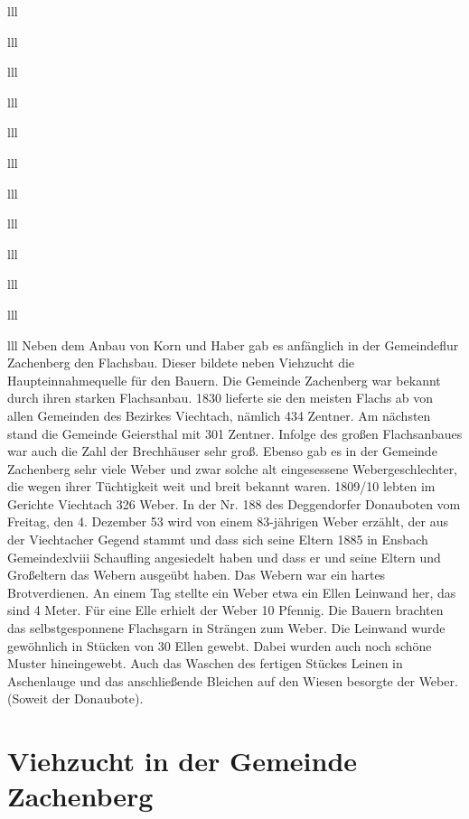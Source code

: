 \documentclass[12pt,a4pager]{book}
\begin{document}
\begin{tabuluar}{lll}
\begin{tabuluar}{lll}
\begin{tabuluar}{lll}
\begin{tabuluar}{lll}
\begin{tabuluar}{lll}
\begin{tabuluar}{lll}
\begin{tabuluar}{lll}
\begin{tabuluar}{lll}
\begin{tabuluar}{lll}
\begin{tabuluar}{lll}
\begin{tabuluar}{lll}
\begin{tabuluar}{lll}
Neben dem Anbau von Korn und Haber gab es anfänglich in der Gemeindeflur
Zachenberg den Flachsbau. Dieser bildete neben Viehzucht die Haupteinnahmequelle
für den Bauern. Die Gemeinde Zachenberg war bekannt durch ihren starken
Flachsanbau. 1830 lieferte sie den meisten Flachs ab von allen Gemeinden des
Bezirkes Viechtach, nämlich 434 Zentner. Am nächsten stand die Gemeinde
Geiersthal mit 301 Zentner. Infolge des großen Flachsanbaues war auch die Zahl
der Brechhäuser sehr groß. Ebenso gab es in der Gemeinde Zachenberg sehr viele
Weber und zwar solche alt eingesessene Webergeschlechter, die wegen ihrer
Tüchtigkeit weit und breit bekannt waren. 1809/10 lebten im Gerichte Viechtach
326 Weber. In der Nr. 188 des Deggendorfer Donauboten vom Freitag, den 4.
Dezember 53 wird von einem 83-jährigen Weber erzählt, der aus der Viechtacher
Gegend stammt und dass sich seine Eltern 1885 in Ensbach Gemeindexlviii
Schaufling angesiedelt haben und dass er und seine Eltern und Großeltern das
Webern ausgeübt haben. Das Webern war ein hartes Brotverdienen. An einem Tag
stellte ein Weber etwa ein Ellen Leinwand her, das sind 4 Meter. Für eine Elle
erhielt der Weber 10 Pfennig. Die Bauern brachten das selbstgesponnene
Flachsgarn in Strängen zum Weber. Die Leinwand wurde gewöhnlich in Stücken von
30 Ellen gewebt. Dabei wurden auch noch schöne Muster hineingewebt. Auch das
Waschen des fertigen Stückes Leinen in Aschenlauge und das anschließende
Bleichen auf den Wiesen besorgte der Weber. (Soweit der Donaubote).

\section{Viehzucht in der Gemeinde Zachenberg}


\end{tabuluar}
\end{tabuluar}
\end{tabuluar}
\end{tabuluar}
\end{tabuluar}
\end{tabuluar}
\end{tabuluar}
\end{tabuluar}
\end{tabuluar}
\end{tabuluar}
\end{tabuluar}
\end{tabuluar}
\end{document}
